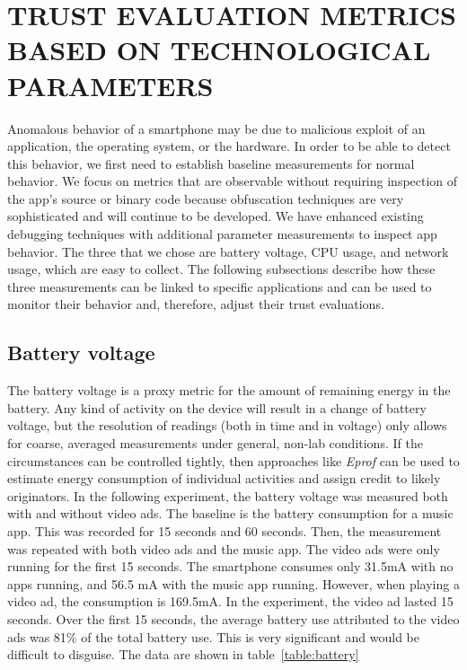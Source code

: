 \section{TRUST EVALUATION METRICS BASED ON TECHNOLOGICAL PARAMETERS}

Anomalous behavior of a smartphone may be due to malicious exploit of an application,
the operating system, or the hardware.
In order to be able to detect this
behavior, we first need to establish baseline measurements for 
normal behavior. We focus on metrics that are observable 
without requiring inspection of the app's source or binary code
because obfuscation techniques are very sophisticated and will continue to be developed.
We have enhanced existing debugging techniques with additional parameter measurements to inspect app behavior.
The three that we chose are battery voltage, CPU usage, and network usage, which are easy to collect.
The following subsections describe how these three measurements can be linked to specific applications
and can be used to monitor their behavior and, therefore, adjust their trust evaluations.


\subsection{Battery voltage}
The battery voltage is a proxy metric for the amount of remaining 
energy in the battery. Any kind of activity on the device will result 
in a change of battery voltage, but the resolution of readings (both 
in time and in voltage) only allows for coarse, averaged measurements 
under general, non-lab conditions.
If the circumstances can be controlled tightly, then approaches like 
\textit{Eprof} \cite{pathak2012fine} can be used to estimate energy consumption 
of individual activities and assign credit to likely originators.  In the following experiment,
the battery voltage was measured both with and without video ads.
The ​baseline is the battery consumption for a music app.
This was recorded for 15 seconds and 60 seconds.  Then, the measurement was repeated
with both video ads and the music app.  The video ads were only running for the first 15 seconds.
The smartphone consumes only 31.5mA with no apps running, and 56.5 mA with the music app
running.
However, when playing a video ad, the consumption is 169.5mA. 
In the experiment, the video ad lasted 15 seconds.
Over the first 15 seconds, the average battery use attributed to the video ads was 81\% of the total
battery use.  This is very significant and would be difficult to disguise.
The data are shown in table~\ref{table:battery}



